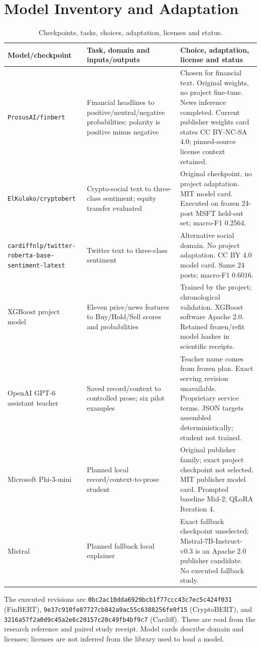 \section*{Model Inventory and Adaptation}
\label{sec:model-inventory}
\begingroup\small
\begin{longtable}{p{}p{}p{}}
\caption{Checkpoints, tasks, choices, adaptation, licenses and status.}\label{tab:model-inventory}\\\toprule Model/checkpoint & Task, domain and inputs/outputs & Choice, adaptation, license and status\\\midrule
\nolinkurl{ProsusAI/finbert} & Financial headlines to positive/neutral/negative probabilities; polarity is positive minus negative & Chosen for financial text. Original weights, no project fine-tune. News inference completed. Current publisher weights card states CC BY-NC-SA 4.0; pinned-source license context retained.\\
\nolinkurl{ElKulako/cryptobert} & Crypto-social text to three-class sentiment; equity transfer evaluated & Original checkpoint, no project adaptation. MIT model card. Executed on frozen 24-post MSFT held-out set; macro-F1 0.2564.\\
\nolinkurl{cardiffnlp/twitter-roberta-base-sentiment-latest} & Twitter text to three-class sentiment & Alternative social domain. No project adaptation. CC BY 4.0 model card. Same 24 posts; macro-F1 0.6016.\\
XGBoost project model & Eleven price/news features to Buy/Hold/Sell scores and probabilities & Trained by the project; chronological validation. XGBoost software Apache 2.0. Retained frozen/refit model hashes in scientific receipts.\\
OpenAI GPT-6 assistant teacher & Saved record/context to controlled prose; six pilot examples & Teacher name comes from frozen plan. Exact serving revision unavailable. Proprietary service terms. JSON targets assembled deterministically; student not trained.\\
Microsoft Phi-3-mini & Planned local record/context-to-prose student & Original publisher family; exact project checkpoint not selected. MIT publisher model card. Prompted baseline Mid-2; QLoRA Iteration 4\cite{phi3_2024,qlora_2023}.\\
Mistral & Planned fallback local explainer & Exact fallback checkpoint unselected; Mistral-7B-Instruct-v0.3 is an Apache 2.0 publisher candidate. No executed fallback study.\\
\bottomrule\end{longtable}
\endgroup
The executed revisions are \nolinkurl{0bc2ac10dda6929bcb1f77ccc43c7ec5c424f031} (FinBERT), \nolinkurl{9e37c910fe87727cb842a9ac55c6388256fe0f15} (CryptoBERT), and \nolinkurl{3216a57f2a0d9c45a2e6c20157c20c49fb4bf9c7} (Cardiff). These are read from the research reference and paired study receipt. Model cards describe domain and licenses\cite{cryptobert_card,twitter_sentiment_card,phi3_card,mistral_card}; licenses are not inferred from the library used to load a model.
